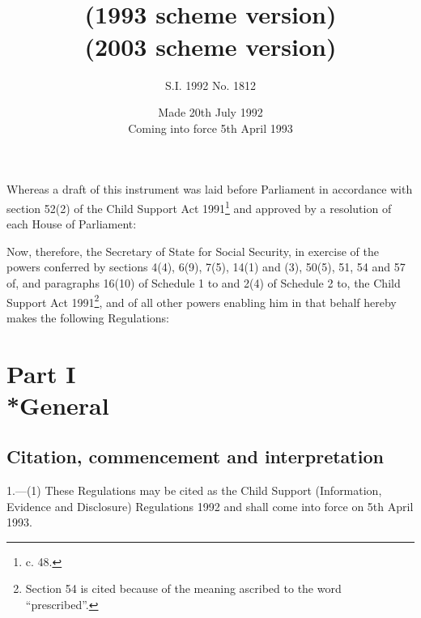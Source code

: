 \documentclass[a4paper,12pt]{article}
\title{\regstitle\\(1993 scheme version)}
\title{\regstitle\\(2003 scheme version)}
\author{S.I. 1992 No. 1812}
\date{Made 20th July 1992\\Coming into force 5th April 1993}
\begin{document}
\maketitle

\noindent
Whereas a draft of this instrument was laid before Parliament in accordance with section 52(2) of the Child Support Act 1991\footnote{ c. 48.} and approved by a resolution of each House of Parliament:

 Now, therefore, the Secretary of State for Social Security, in exercise of the powers conferred by sections 4(4), 6(9), 7(5), 14(1) and (3), 50(5), 51, 54 and 57 of, and paragraphs 16(10) of Schedule 1 to and 2(4) of Schedule 2 to, the Child Support Act 1991\footnote{\frenchspacing Section 54 is cited because of the meaning ascribed to the word “prescribed”.}, and of all other powers enabling him in that behalf hereby makes the following Regulations:


{\sloppy

\tableofcontents

}

\setcounter{secnumdepth}{-2}

\section[Part I --- General]{Part I\\*General}

\renewcommand\parthead{--- Part I}

\subsection[1. Citation, commencement and interpretation]{Citation, commencement and interpretation}

1.—(1) These Regulations may be cited as the Child Support (Information, Evidence and Disclosure) Regulations 1992 and shall come into force on 5th April 1993.
\end{document}
